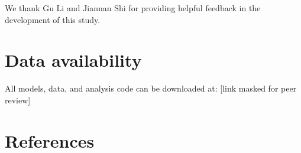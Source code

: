 \documentclass[
  11pt,
]{article}
\begin{document}
We thank Gu Li and Jiannan Shi for providing helpful feedback in the
development of this study.

\hypertarget{data-availability}{%
\section{Data availability}\label{data-availability}}

All models, data, and analysis code can be downloaded at: {[}link masked
for peer review{]}

\newpage

\hypertarget{references}{%
\section*{References}\label{references}}
\end{document}
